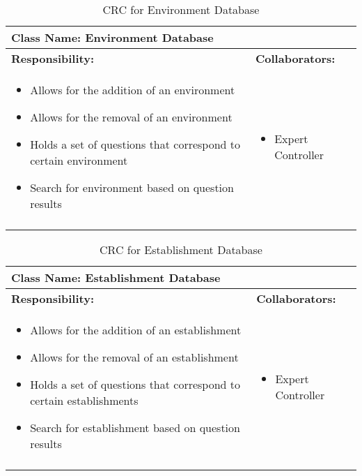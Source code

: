 \documentclass[titlepage]{article}
\begin{document}
	\begin{longtable}{| p{} | p{} |}
			\hline
			 \multicolumn{2}{|l|}{\textbf{Class Name: Environment Database}} \\
			\hline
			\textbf{Responsibility:} & \textbf{Collaborators:} \\
			\hline
				\begin{itemize}
					\item  Allows for the addition of an environment
					\item Allows for the removal of an environment
					\item Holds a set of questions that correspond to certain environment
					\item Search for environment based on question results
				\end{itemize} & 
				\begin{itemize}
					\item Expert Controller
				\end{itemize} 
				\\
			\hline
		\caption{CRC for Environment Database}
	\end{longtable}
	
\newpage
	\begin{longtable}{| p{} | p{} |}
			\hline
			 \multicolumn{2}{|l|}{\textbf{Class Name: Establishment Database}} \\
			\hline
			\textbf{Responsibility:} & \textbf{Collaborators:} \\
			\hline
				\begin{itemize}
					\item Allows for the addition of an establishment
					\item Allows for the removal of an establishment
					\item Holds a set of questions that correspond to certain establishments
					\item Search for establishment based on question results
				\end{itemize} & 
				\begin{itemize}
					\item Expert Controller
				\end{itemize} 
				\\
			\hline
		\caption{CRC for Establishment Database}
	\end{longtable}
	
	
	
\end{document}
